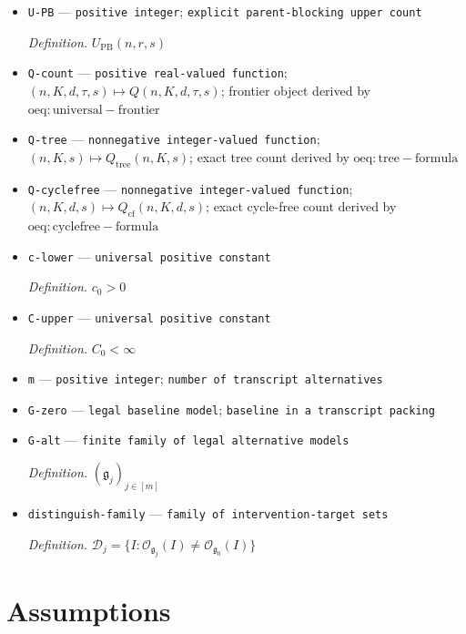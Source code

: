\documentclass{article}
\begin{document}
\begin{itemize}
  \par\smallskip\noindent\emph{Definition.} \(F(n,r,s)\)
  \item \texttt{U-\allowbreak{}PB} --- \texttt{positive integer}; \texttt{explicit parent-\allowbreak{}blocking upper count}
  \par\smallskip\noindent\emph{Definition.} \(U_{\mathrm{PB}}(n,r,s)\)
  \item \texttt{Q-\allowbreak{}count} --- \texttt{positive real-\allowbreak{}valued function}; \((n,K,d,\tau,s)\mapsto Q(n,K,d,\tau,s)\); frontier object derived by \(\mathrm{oeq:universal-frontier}\)
  \item \texttt{Q-\allowbreak{}tree} --- \texttt{nonnegative integer-\allowbreak{}valued function}; \((n,K,s)\mapsto Q_{\mathrm{tree}}(n,K,s)\); exact tree count derived by \(\mathrm{oeq:tree-formula}\)
  \item \texttt{Q-\allowbreak{}cyclefree} --- \texttt{nonnegative integer-\allowbreak{}valued function}; \((n,K,d,s)\mapsto Q_{\mathrm{cf}}(n,K,d,s)\); exact cycle-free count derived by \(\mathrm{oeq:cyclefree-formula}\)
  \item \texttt{c-\allowbreak{}lower} --- \texttt{universal positive constant}
  \par\smallskip\noindent\emph{Definition.} \(c_0>0\)
  \item \texttt{C-\allowbreak{}upper} --- \texttt{universal positive constant}
  \par\smallskip\noindent\emph{Definition.} \(C_0<\infty\)
  \item \texttt{m} --- \texttt{positive integer}; \texttt{number of transcript alternatives}
  \item \texttt{G-\allowbreak{}zero} --- \texttt{legal baseline model}; \texttt{baseline in a transcript packing}
  \item \texttt{G-\allowbreak{}alt} --- \texttt{finite family of legal alternative models}
  \par\smallskip\noindent\emph{Definition.} \((\mathfrak g_j)_{j\in[m]}\)
  \item \texttt{distinguish-\allowbreak{}family} --- \texttt{family of intervention-\allowbreak{}target sets}
  \par\smallskip\noindent\emph{Definition.} \(\mathscr D_j=\{I:\mathcal O_{\mathfrak g_j}(I)\ne\mathcal O_{\mathfrak g_0}(I)\}\)
\end{itemize}

\section{Assumptions}
\end{document}
